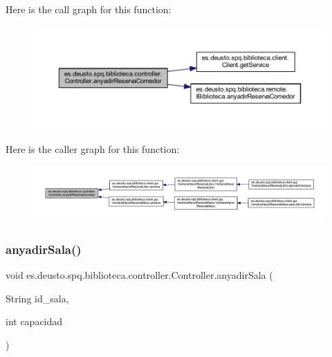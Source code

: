 Here is the call graph for this function\+:
\nopagebreak
\begin{figure}[H]
\begin{center}
\leavevmode
\includegraphics[width=350pt]{classes_1_1deusto_1_1spq_1_1biblioteca_1_1controller_1_1_controller_a5c2097f9ae2be60cb00c6d408636feb3_cgraph}
\end{center}
\end{figure}
Here is the caller graph for this function\+:
\nopagebreak
\begin{figure}[H]
\begin{center}
\leavevmode
\includegraphics[width=350pt]{classes_1_1deusto_1_1spq_1_1biblioteca_1_1controller_1_1_controller_a5c2097f9ae2be60cb00c6d408636feb3_icgraph}
\end{center}
\end{figure}
\mbox{\label{classes_1_1deusto_1_1spq_1_1biblioteca_1_1controller_1_1_controller_aa000adfc328c903b4915e2e20c94e22d}} 
\subsubsection{\texorpdfstring{anyadir\+Sala()}{anyadirSala()}}
{\footnotesize\ttfamily void es.\+deusto.\+spq.\+biblioteca.\+controller.\+Controller.\+anyadir\+Sala (\begin{DoxyParamCaption}\item[{String}]{id\+\_\+sala,  }\item[{int}]{capacidad }\end{DoxyParamCaption})}

